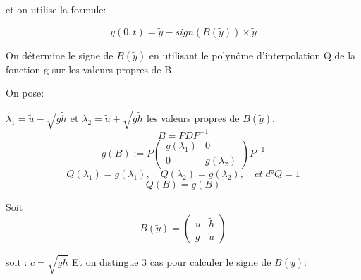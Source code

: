 et on utilise la formule:

$$ y(0,t) = \tilde{y} - sign(B(\tilde{y})) \times \tilde{y}$$

On d\'etermine le signe de $B(\tilde{y})$ en utilisant le polyn\^ome d'interpolation Q de la fonction g sur les valeurs propres de B.

On pose:

$\lambda_1 = \tilde{u}-\sqrt{g \tilde h}$ et $\lambda_2 = \tilde{u} + \sqrt{g \tilde h}$ les valeurs propres de $B(\tilde{y})$.
$$B = PDP^{-1}$$
$$g(B):= P\begin{pmatrix}
g(\lambda_1) & 0 \\
0 & g(\lambda_2) 
\end{pmatrix}P^{-1}$$
$$Q(\lambda_1) = g(\lambda_1), \quad
Q(\lambda_2) = g(\lambda_2), \quad et \; d°Q = 1$$
$$Q(B) = g(B)$$

Soit $$B(\tilde y) = \begin{pmatrix}
\tilde u & \tilde h \\
g & \tilde u 
\end{pmatrix}$$

soit : $\tilde{c} = \sqrt{g \tilde h}$ 
Et on distingue 3 cas pour calculer le signe de $B(\tilde y)$:

